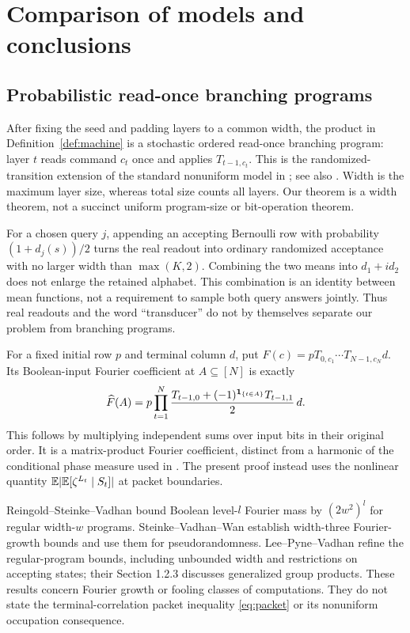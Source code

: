 \section{Comparison of models and conclusions}\label{sec:comparison}
\subsection{Probabilistic read-once branching programs}
After fixing the seed and padding layers to a common width, the product
in Definition~\ref{def:machine} is a stochastic ordered read-once
branching program: layer $t$ reads command $c_t$ once and applies
$T_{t-1,c_t}$. This is the randomized-transition extension of the
standard nonuniform model in \cite[Section 1.1]{RSV}; see also
\cite{Wegener}. Width is the maximum layer size, whereas total size
counts all layers. Our theorem is a width theorem, not a succinct
uniform program-size or bit-operation theorem.

For a chosen query $j$, appending an accepting Bernoulli row with
probability $(1+d_j(s))/2$ turns the real readout into ordinary randomized
acceptance with no larger width than $\max(K,2)$. Combining the two
means into $d_1+i d_2$ does not enlarge the retained alphabet. This
combination is an identity between mean functions, not a requirement to
sample both query answers jointly. Thus real readouts and the word
``transducer'' do not by themselves separate our problem from branching
programs.

For a fixed initial row $p$ and terminal column $d$, put
$F(c)=pT_{0,c_1}\cdots T_{N-1,c_N}d$. Its Boolean-input Fourier
coefficient at $A\subseteq[N]$ is exactly
\begin{equation}\label{eq:bp-fourier}
 \widehat F(A)=p\prod_{t=1}^N
 \frac{T_{t-1,0}+(-1)^{\mathbf1_{\{t\in A\}}}T_{t-1,1}}2\,d.
\end{equation}
This follows by multiplying independent sums over input bits in their
original order. It is a matrix-product Fourier coefficient, distinct
from a harmonic of the conditional phase measure used in \cite{GTF34}.
The present proof instead uses the nonlinear quantity
$\mathbb E|\mathbb E[\zeta^{L_t}\mid S_t]|$ at packet boundaries.

Reingold--Steinke--Vadhan \cite[Theorem 1.4]{RSV} bound Boolean
level-$l$ Fourier mass by $(2w^2)^l$ for regular width-$w$ programs.
Steinke--Vadhan--Wan \cite{SVW} establish width-three Fourier-growth
bounds and use them for pseudorandomness. Lee--Pyne--Vadhan
\cite[Definitions 3--5 and Theorem 6]{LPV} refine the regular-program
bounds, including unbounded width and restrictions on accepting states;
their Section 1.2.3 discusses generalized group products. These results
concern Fourier growth or fooling classes of computations. They do not
state the terminal-correlation packet inequality \eqref{eq:packet} or
its nonuniform occupation consequence.

